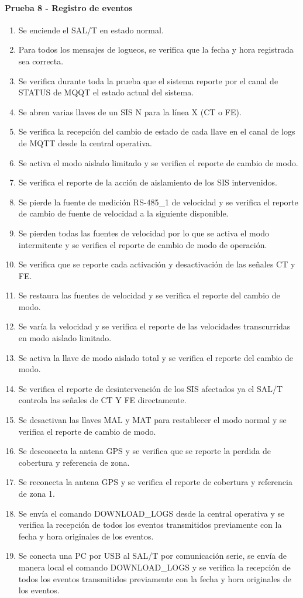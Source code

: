 \paragraph{Prueba 8 - Registro de eventos}
\begin{enumerate}
\item	Se enciende el SAL/T en estado normal.
\item	Para todos los mensajes de logueos, se verifica que la fecha y hora registrada sea correcta.
\item	Se verifica durante toda la prueba que el sistema reporte por el canal de STATUS de MQQT el estado actual del sistema.
\item	Se abren varias llaves de un SIS N para la línea X (CT o FE).
\item	Se verifica la recepción del cambio de estado de cada llave en el canal de logs de MQTT desde la central operativa.
\item	Se activa el modo aislado limitado y se verifica el reporte de cambio de modo.
\item	Se verifica el reporte de la acción de aislamiento de los SIS intervenidos.
\item	Se pierde la fuente de medición RS-485\_1 de velocidad y se verifica el reporte de cambio de fuente de velocidad a la siguiente disponible.
\item	Se pierden todas las fuentes de velocidad por lo que se activa el modo intermitente y se verifica el reporte de cambio de modo de operación.
\item	Se verifica que se reporte cada activación y desactivación de las señales CT y FE.
\item	Se restaura las fuentes de velocidad y se verifica el reporte del cambio de modo.
\item	Se varía la velocidad y se verifica el reporte de las velocidades transcurridas en modo aislado limitado.
\item	Se activa la llave de modo aislado total y se verifica el reporte del cambio de modo.
\item	Se verifica el reporte de desintervención de los SIS afectados ya el SAL/T controla las señales de CT Y FE directamente.
\item	Se desactivan las llaves MAL y MAT para restablecer el modo normal y se verifica el reporte de cambio de modo.
\item	Se desconecta la antena GPS y se verifica que se reporte la perdida de cobertura y referencia de zona.
\item	Se reconecta la antena GPS y se verifica el reporte de cobertura y referencia de zona 1.
\item	Se envía el comando DOWNLOAD\_LOGS desde la central operativa y se verifica la recepción de todos los eventos transmitidos previamente con la fecha y hora originales de los eventos.
\item	Se conecta una PC por USB al SAL/T por comunicación serie, se envía de manera local el comando DOWNLOAD\_LOGS y se verifica la recepción de todos los eventos transmitidos previamente con la fecha y hora originales de los eventos.

\end{enumerate}


